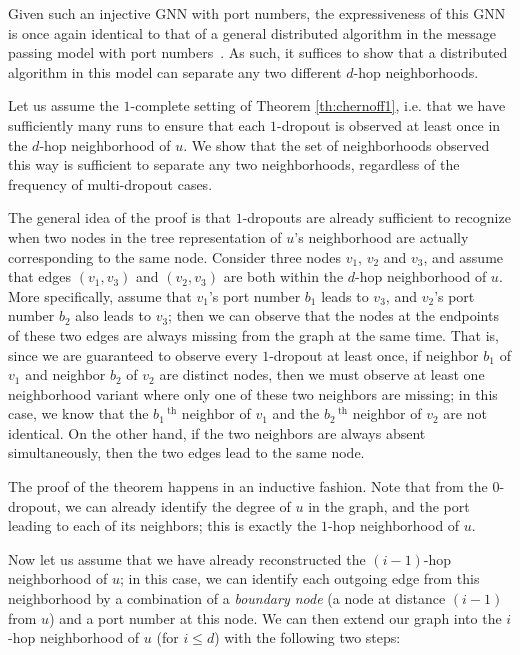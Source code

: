 \documentclass{article}
\begin{document}
Given such an injective GNN with port numbers, the expressiveness of this GNN is once again identical to that of a general distributed algorithm in the message passing model with port numbers~\citep{ports}. As such, it suffices to show that a distributed algorithm in this model can separate any two different $d$-hop neighborhoods.

Let us assume the $1$-complete setting of Theorem \ref{th:chernoff1}, i.e. that we have sufficiently many runs to ensure that each $1$-dropout is observed at least once in the $d$-hop neighborhood of $u$. We show that the set of neighborhoods observed this way is sufficient to separate any two neighborhoods, regardless of the frequency of multi-dropout cases.

The general idea of the proof is that $1$-dropouts are already sufficient to recognize when two nodes in the tree representation of $u$'s neighborhood are actually corresponding to the same node. Consider three nodes $v_1$, $v_2$ and $v_3$, and assume that edges $(v_1, v_3)$ and $(v_2, v_3)$ are both within the $d$-hop neighborhood of $u$. More specifically, assume that $v_1$'s port number $b_1$ leads to $v_3$, and $v_2$'s port number $b_2$ also leads to $v_3$; then we can observe that the nodes at the endpoints of these two edges are always missing from the graph at the same time. That is, since we are guaranteed to observe every $1$-dropout at least once, if neighbor $b_1$ of $v_1$ and neighbor $b_2$ of $v_2$ are distinct nodes, then we must observe at least one neighborhood variant where only one of these two neighbors are missing; in this case, we know that the $b_1\,\!^{\text{th}}$ neighbor of $v_1$ and the $b_2\,\!^{\text{th}}$ neighbor of $v_2$ are not identical. On the other hand, if the two neighbors are always absent simultaneously, then the two edges lead to the same node.

The proof of the theorem happens in an inductive fashion. Note that from the $0$-dropout, we can already identify the degree of $u$ in the graph, and the port leading to each of its neighbors; this is exactly the $1$-hop neighborhood of $u$.

Now let us assume that we have already reconstructed the $(i-1)$-hop neighborhood of $u$; in this case, we can identify each outgoing edge from this neighborhood by a combination of a \textit{boundary node} (a node at distance $(i-1)$ from $u$) and a port number at this node. We can then extend our graph into the $i$-hop neighborhood of $u$ (for $i \leq d$) with the following two steps:
\end{document}
